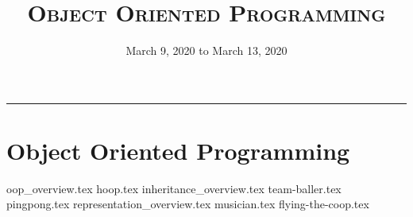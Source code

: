 \documentclass{exam}
\title{\textsc{Object Oriented Programming}}
\date{March 9, 2020 to March 13, 2020}
\begin{document}
\maketitle
\rule{\textwidth}{0.15em}
\fontsize{12}{15}\selectfont

\section{Object Oriented Programming}
\begin{questions}
{oop_overview.tex}
{hoop.tex}
\newpage
{inheritance_overview.tex}
{team-baller.tex}
{pingpong.tex}
\newpage
{representation_overview.tex}
{musician.tex}
{flying-the-coop.tex}
\end{questions}
\end{document}
